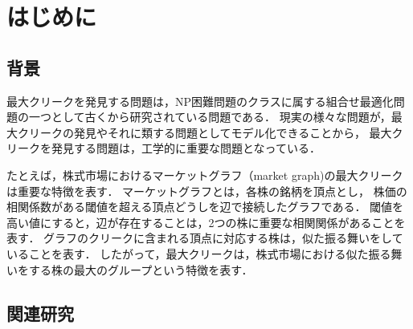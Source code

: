 \chapter{はじめに}
\label{ch:intro}
\section{背景}
最大クリークを発見する問題は，NP困難問題のクラスに属する組合せ最適化問題の一つとして古くから研究されている問題である\cite{Karp1972}．
現実の様々な問題が，最大クリークの発見やそれに類する問題としてモデル化できることから，
最大クリークを発見する問題は，工学的に重要な問題となっている．

たとえば，株式市場におけるマーケットグラフ（market graph)の最大クリークは重要な特徴を表す．
マーケットグラフとは，各株の銘柄を頂点とし，
株価の相関係数がある閾値を超える頂点どうしを辺で接続したグラフである．
閾値を高い値にすると，辺が存在することは，2つの株に重要な相関関係があることを表す．
グラフのクリークに含まれる頂点に対応する株は，似た振る舞いをしていることを表す．
したがって，最大クリークは，株式市場における似た振る舞いをする株の最大のグループという特徴を表す\cite{BOGINSKI20063171}．
\section{関連研究}
\label{sec:relation}

